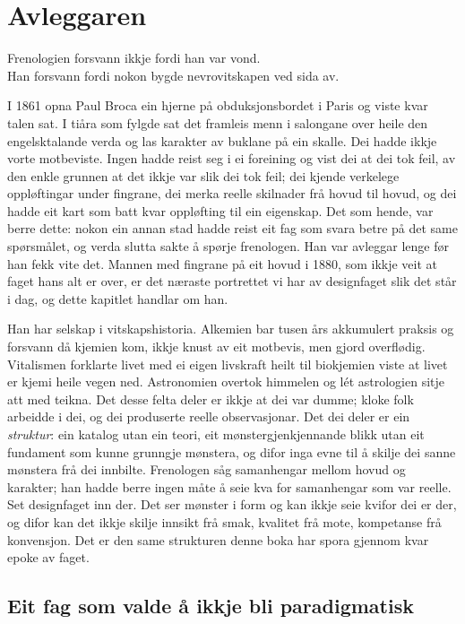\chapter{Avleggaren}

\begin{motto}
Frenologien forsvann ikkje fordi han var vond.\\ Han forsvann fordi nokon bygde nevrovitskapen ved sida av.
\end{motto}

I 1861 opna Paul Broca ein hjerne på obduksjonsbordet i Paris og viste kvar talen sat. I tiåra som fylgde sat det framleis menn i salongane over heile den engelsktalande verda og las karakter av buklane på ein skalle. Dei hadde ikkje vorte motbeviste. Ingen hadde reist seg i ei foreining og vist dei at dei tok feil, av den enkle grunnen at det ikkje var slik dei tok feil; dei kjende verkelege oppløftingar under fingrane, dei merka reelle skilnader frå hovud til hovud, og dei hadde eit kart som batt kvar oppløfting til ein eigenskap. Det som hende, var berre dette: nokon ein annan stad hadde reist eit fag som svara betre på det same spørsmålet, og verda slutta sakte å spørje frenologen. Han var avleggar lenge før han fekk vite det. Mannen med fingrane på eit hovud i 1880, som ikkje veit at faget hans alt er over, er det næraste portrettet vi har av designfaget slik det står i dag, og dette kapitlet handlar om han.

Han har selskap i vitskapshistoria. Alkemien bar tusen års akkumulert praksis og forsvann då kjemien kom, ikkje knust av eit motbevis, men gjord overflødig. Vitalismen forklarte livet med ei eigen livskraft heilt til biokjemien viste at livet er kjemi heile vegen ned. Astronomien overtok himmelen og lét astrologien sitje att med teikna. Det desse felta deler er ikkje at dei var dumme; kloke folk arbeidde i dei, og dei produserte reelle observasjonar. Det dei deler er ein \emph{struktur}: ein katalog utan ein teori, eit mønstergjenkjennande blikk utan eit fundament som kunne grunngje mønstera, og difor inga evne til å skilje dei sanne mønstera frå dei innbilte. Frenologen såg samanhengar mellom hovud og karakter; han hadde berre ingen måte å seie kva for samanhengar som var reelle. Set designfaget inn der. Det ser mønster i form og kan ikkje seie kvifor dei er der, og difor kan det ikkje skilje innsikt frå smak, kvalitet frå mote, kompetanse frå konvensjon. Det er den same strukturen denne boka har spora gjennom kvar epoke av faget.

\section{Eit fag som valde å ikkje bli paradigmatisk}

